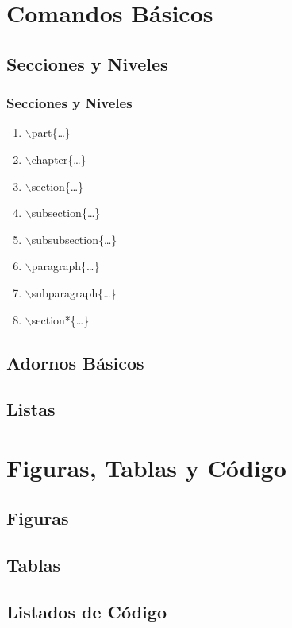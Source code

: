 \documentclass[a4paper,slidestop,xcolor=pst,dvips,blue]{beamer}
\newcommand{\command}[1]{$\backslash$#1\{\dots\}}
\begin{document}
\section{Comandos Básicos}

\subsection{Secciones y Niveles}

\begin{frame}[c]
    \frametitle{Secciones y Niveles}
    \begin{enumerate}
        \item \command{part}
        \item \command{chapter}
        \item \command{section}
        \item \command{subsection}
        \item \command{subsubsection}
        \item \command{paragraph}
        \item \command{subparagraph}
        \item \command{section*}
    \end{enumerate}
\end{frame}

\subsection{Adornos Básicos}

\subsection{Listas}

\section{Figuras, Tablas y Código}

\subsection{Figuras}

\subsection{Tablas}

\subsection{Listados de Código}
\end{document}
